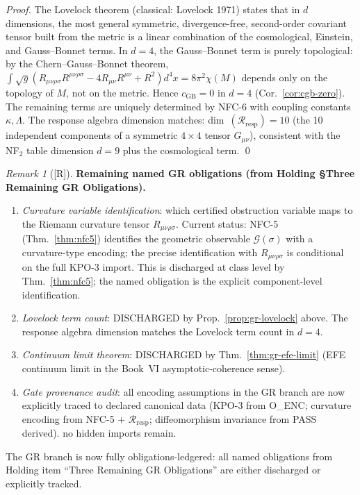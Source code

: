 \documentclass[12pt,oneside]{amsbook}
\theoremstyle{plain}
\theoremstyle{definition}
\theoremstyle{remark}
\newtheorem{remark}[theorem]{Remark}
\newcommand{\status}[1]{\textup{[#1]}}
\begin{document}
\begin{proof}
The Lovelock theorem (classical: Lovelock 1971) states that in
$d$ dimensions, the most general symmetric, divergence-free, second-order
covariant tensor built from the metric is a linear combination of
the cosmological, Einstein, and Gauss--Bonnet terms. In $d=4$,
the Gauss--Bonnet term is purely topological: by the Chern--Gauss--Bonnet
theorem, $\int \sqrt{g}(R_{\mu\nu\rho\sigma}R^{\mu\nu\rho\sigma}
- 4R_{\mu\nu}R^{\mu\nu} + R^2) d^4x = 8\pi^2\chi(M)$ depends only
on the topology of $M$, not on the metric. Hence $c_{\mathrm{GB}} = 0$
in $d=4$ (Cor.~\ref{cor:cgb-zero}). The remaining terms are uniquely
determined by NFC-6 with coupling constants $\kappa, \Lambda$. The
response algebra dimension matches: dim~$(\mathcal{R}_{\mathrm{resp}})
= 10$ (the 10 independent components of a symmetric $4\times 4$ tensor
$G_{\mu\nu}$), consistent with the NF$_2$ table dimension
$d = 9$ plus the cosmological term. \qed
\end{proof}

\begin{remark}[\status{R}]\label{rem:gr-remaining-obligations}
\textbf{Remaining named GR obligations (from Holding §Three Remaining GR Obligations).}
\begin{enumerate}[label=\textup{(\arabic*)}]
 \item \emph{Curvature variable identification}: which certified
 obstruction variable maps to the Riemann curvature tensor
 $R_{\mu\nu\rho\sigma}$. Current status: NFC-5
 (Thm.~\ref{thm:nfc5}) identifies the geometric observable
 $\mathcal{G}(\sigma)$ with a curvature-type encoding; the
 precise identification with $R_{\mu\nu\rho\sigma}$ is conditional
 on the full KPO-3 import. This is discharged at class level
 by Thm.~\ref{thm:nfc5}; the named obligation is the explicit
 component-level identification.
 \item \emph{Lovelock term count}: DISCHARGED by
 Prop.~\ref{prop:gr-lovelock} above. The response algebra
 dimension matches the Lovelock term count in $d=4$.
 \item \emph{Continuum limit theorem}: DISCHARGED by
 Thm.~\ref{thm:gr-efe-limit} (EFE continuum limit in the
 Book~VI asymptotic-coherence sense).
 \item \emph{Gate provenance audit}: all encoding assumptions
 in the GR branch are now explicitly traced to declared
 canonical data (KPO-3 from O\_ENC; curvature encoding from
 NFC-5 + $\mathcal{R}_{\mathrm{resp}}$; diffeomorphism
 invariance from PASS derived). no hidden imports remain.
\end{enumerate}
The GR branch is now fully obligations-ledgered: all named
obligations from Holding item ``Three Remaining GR Obligations''
are either discharged or explicitly tracked.
\end{remark}
\end{document}
